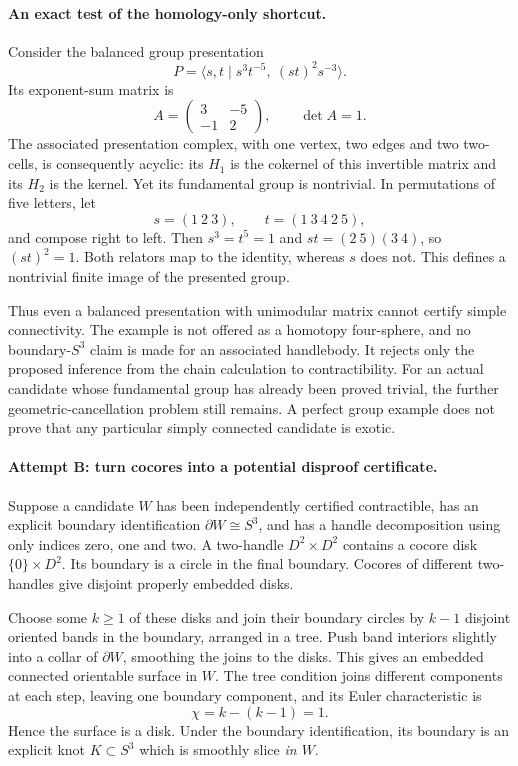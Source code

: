 \documentclass[11pt]{article}
\begin{document}
\paragraph{An exact test of the homology-only shortcut.}
Consider the balanced group presentation
\begin{equation}\label{cont22:presentation}
 P=\langle s,t\mid s^3t^{-5},\ (st)^2s^{-3}\rangle.
\end{equation}
Its exponent-sum matrix is
\[
 A=\begin{pmatrix}3&-5\\-1&2\end{pmatrix},\qquad\det A=1.
\]
The associated presentation complex, with one vertex, two edges and two
two-cells, is consequently acyclic: its $H_1$ is the cokernel of this
invertible matrix and its $H_2$ is the kernel. Yet its fundamental group
is nontrivial. In permutations of five letters, let
\[
 s=(1\ 2\ 3),\qquad t=(1\ 3\ 4\ 2\ 5),
\]
and compose right to left. Then
$s^3=t^5=1$ and $st=(2\ 5)(3\ 4)$, so $(st)^2=1$.
Both relators map to the identity, whereas $s$ does not. This defines
a nontrivial finite image of the presented group.

Thus even a balanced presentation with unimodular matrix cannot certify
simple connectivity. The example is not offered as a homotopy four-sphere,
and no boundary-$S^3$ claim is made for an associated handlebody. It
rejects only the proposed inference from the chain calculation to
contractibility. For an actual candidate whose fundamental group has
already been proved trivial, the further geometric-cancellation problem
still remains. A perfect group example does not prove that any particular
simply connected candidate is exotic.

\paragraph{Attempt B: turn cocores into a potential disproof certificate.}
Suppose a candidate $W$ has been independently certified contractible,
has an explicit boundary identification $\partial W\cong S^3$, and has
a handle decomposition using only indices zero, one and two. A
two-handle $D^2\times D^2$ contains a cocore disk $\{0\}\times D^2$.
Its boundary is a circle in the final boundary. Cocores of different
two-handles give disjoint properly embedded disks.

Choose some $k\ge1$ of these disks and join their boundary circles by
$k-1$ disjoint oriented bands in the boundary, arranged in a tree.
Push band interiors slightly into a collar of $\partial W$, smoothing
the joins to the disks. This gives an embedded connected orientable
surface in $W$. The tree condition joins different components at each
step, leaving one boundary component, and its Euler characteristic is
\[
 \chi=k-(k-1)=1.
\]
Hence the surface is a disk. Under the boundary identification, its
boundary is an explicit knot $K\subset S^3$ which is smoothly slice
\emph{in $W$}.
\end{document}

